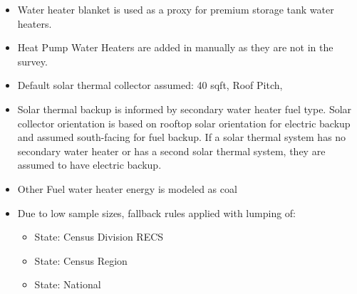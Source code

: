\begin{itemize}
\item Water heater blanket is used as a proxy for premium storage tank water heaters.
\item Heat Pump Water Heaters are added in manually as they are not in the survey.
\item Default solar thermal collector assumed: 40 sqft, Roof Pitch,
\item Solar thermal backup is informed by secondary water heater fuel type. Solar collector orientation is based on rooftop solar orientation for electric backup and assumed south-facing for fuel backup. If a solar thermal system has no secondary water heater or has a second solar thermal system, they are assumed to have electric backup.
\item Other Fuel water heater energy is modeled as coal
\item Due to low sample sizes, fallback rules applied with lumping of:
  \begin{itemize}
  \item [1] State: Census Division RECS
  \item [2] State: Census Region
  \item [3] State: National
  \end{itemize}
\end{itemize}
